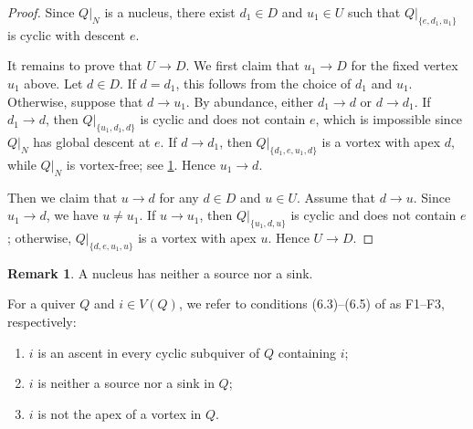 \documentclass[10pt,a4paper]{amsart}
\theoremstyle{definition}
\theoremstyle{definition}
\newtheorem{remark}[remark]{Remark}
\numberwithin{equation}{section}
\numberwithin{table}{section}
\begin{document}
\begin{proof}
Since $Q|_N$ is a nucleus, there exist $d_1\in D$ and $u_1\in U$ such that
$Q|_{\{e,d_1,u_1\}}$ is cyclic with descent $e$.

It remains to prove that $U\to D$. We first claim that $u_1\to D$ for the fixed
vertex $u_1$ above. Let $d\in D$. If $d=d_1$, this follows from the choice of
$d_1$ and $u_1$. Otherwise, suppose that $d\to u_1$. By abundance, either $d_1\to d$ or
$d\to d_1$. If $d_1\to d$, then $Q|_{\{u_1,d_1,d\}}$ is cyclic and does not
contain $e$, which is impossible since $Q|_N$ has global descent at $e$. If
$d\to d_1$, then $Q|_{\{d_1,e,u_1,d\}}$ is a vortex with apex $d$, while
$Q|_N$ is vortex-free; see \cref{fig:global-descent-contradictions}. Hence
$u_1\to d$.

\begin{figure}[H]
\centering
{}
\caption{}
\label{fig:global-descent-contradictions}
\end{figure}

Then we claim that $u\to d$ for any $d\in D$ and $u\in U$.
Assume that $d\to u$.
Since $u_1\to d$, we have $u\ne u_1$. If $u\to u_1$, then $Q|_{\{u_1,d,u\}}$
is cyclic and does not contain $e$; otherwise, $Q|_{\{d,e,u_1,u\}}$ is a
vortex with apex $u$. Hence $U\to D$.
\end{proof}

\begin{remark}\label{rem:nucleus-no-source-sink}
A nucleus has neither a source nor a sink.
\end{remark}

For a quiver $Q$ and $i\in V(Q)$, we refer to conditions (6.3)--(6.5) of
\cite{FN25} as F1--F3, respectively:
\begin{enumerate}[label=(F\arabic*),leftmargin=3.2em,itemsep=1pt,topsep=2pt]
\item $i$ is an ascent in every cyclic subquiver of $Q$ containing $i$;
\item $i$ is neither a source nor a sink in $Q$;
\item $i$ is not the apex of a vortex in $Q$.
\end{enumerate}
\end{document}
